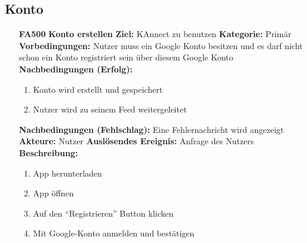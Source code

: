 \documentclass[parskip=full]{scrartcl}
\begin{document}
		\subsection{Konto} \label{sec:FAKonto}
		\begin{itemize}[nosep]
			
			\item[\textbf{FA500}]\textbf{Konto erstellen}
							\newline \textbf{Ziel:} KAnnect zu benutzen
							\newline \textbf{Kategorie:} Primär
							\newline \textbf{Vorbedingungen:} Nutzer muss ein Google Konto besitzen und es darf nicht schon ein Konto registriert sein über diesem Google Konto
							\newline \textbf{Nachbedingungen (Erfolg):} 
							\begin{enumerate}[nosep]
								\item Konto wird erstellt und gespeichert
								\item Nutzer wird zu seinem \gls{Feed} weitergeleitet 
							\end{enumerate}
							\textbf{Nachbedingungen (Fehlschlag):} Eine Fehlernachricht wird angezeigt
							\newline \textbf{Akteure:} Nutzer
							\newline \textbf{Auslösendes Ereignis:} Anfrage des Nutzers
							\newline \textbf{Beschreibung:}
							\begin{enumerate}[nosep]
								\item App herunterladen
								\item App öffnen
								\item Auf den “Registrieren” Button klicken
								\item Mit Google-Konto anmelden und bestätigen\\
							\end{enumerate}
		

\end{itemize}
\end{document}
